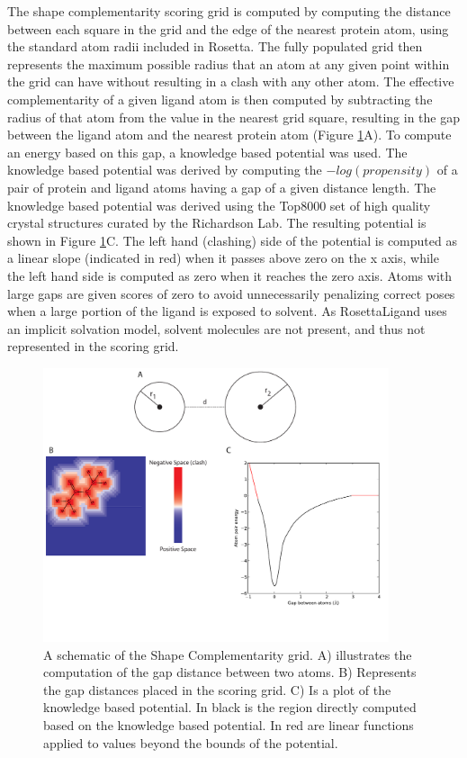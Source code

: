 The shape complementarity scoring grid is computed by computing the distance between each square in the grid and the edge of the nearest protein atom, using the standard atom radii included in Rosetta.
The fully populated grid then represents the maximum possible radius that an atom at any given point within the grid can have without resulting in a clash with any other atom.
The effective complementarity of a given ligand atom is then computed by subtracting the radius of that atom from the value in the nearest grid square, resulting in the gap between the ligand atom and the nearest protein atom (Figure \ref{fig:shape_schematic}A). 
To compute an energy based on this gap, a knowledge based potential was used. 
The knowledge based potential was derived by computing the $-log(propensity)$ of a pair of protein and ligand atoms having a gap of a given distance length.
The knowledge based potential was derived using the Top8000 set of high quality crystal structures curated by the Richardson Lab.
The resulting potential is shown in Figure \ref{fig:shape_schematic}C.
The left hand (clashing) side of the potential is computed as a linear slope (indicated in red) when it passes above zero on the x axis, while the left hand side is computed as zero when it reaches the zero axis.
Atoms with large gaps are given scores of zero to avoid unnecessarily penalizing correct poses when a large portion of the ligand is exposed to solvent.
As RosettaLigand uses an implicit solvation model, solvent molecules are not present, and thus not represented in the scoring grid.
\begin{figure}
\centering
\includegraphics[width=4in]{figures/lowres_appendix/Shape_Complementarity.pdf}
\caption{
A schematic of the Shape Complementarity grid.
A) illustrates the computation of the gap distance between two atoms.
B) Represents the gap distances placed in the scoring grid.
C) Is a plot of the knowledge based potential.
In black is the region directly computed based on the knowledge based potential.
In red are linear functions applied to values beyond the bounds of the potential.
}
\label{fig:shape_schematic}
\end{figure}

